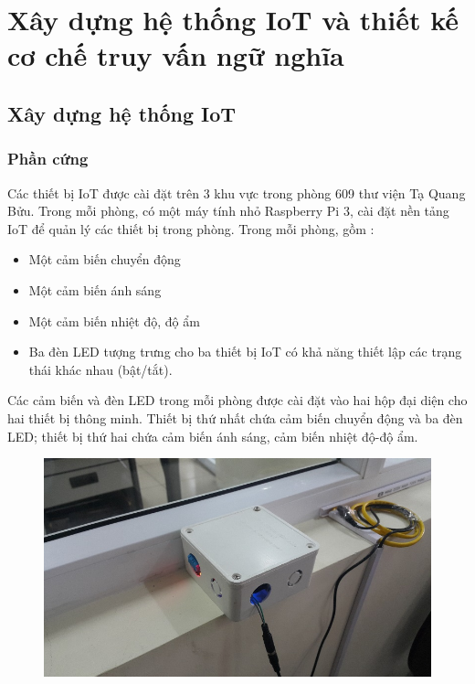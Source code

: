 \newcommand{\blank}[1]{\hspace*{#1}\linebreak[0]}
\chapter{Xây dựng hệ thống IoT và thiết kế cơ chế truy vấn ngữ nghĩa}
\section{Xây dựng hệ thống IoT}
\subsection{Phần cứng}
Các thiết bị IoT được cài đặt trên 3 khu vực trong phòng 609 thư viện Tạ Quang Bửu. Trong mỗi phòng, có một máy tính nhỏ Raspberry Pi 3, cài đặt nền tảng IoT để quản lý các thiết bị trong phòng. Trong mỗi phòng, gồm :
\begin{itemize}
	\item Một cảm biến chuyển động
	\item Một cảm biến ánh sáng
	\item Một cảm biến nhiệt độ, độ ẩm
	\item Ba đèn LED tượng trưng cho ba thiết bị IoT có khả năng thiết lập các trạng thái khác nhau (bật/tắt).
\end{itemize}
Các cảm biến và đèn LED trong mỗi phòng được cài đặt vào hai hộp đại diện cho hai thiết bị thông minh. Thiết bị thứ nhất chứa cảm biến chuyển động và ba đèn LED; thiết bị thứ hai chứa cảm biến ánh sáng, cảm biến nhiệt độ-độ ẩm. 
\clearpage

\begin{figure}
	\center
	\includegraphics[scale=1]{image/hop_1}
	\label{fig:2hop}
\end{figure}

